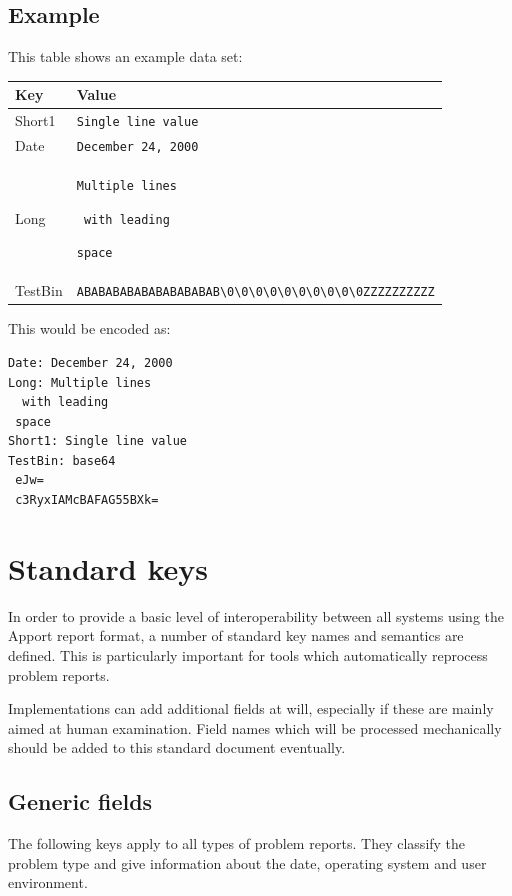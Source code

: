 \documentclass[DIV12,halfparskip]{scrartcl}
\begin{document}
\subsection{Example}

This table shows an example data set:

\begin{tabular}{lp{10cm}}\toprule
\textbf{Key} & \textbf{Value}\\
\midrule
Short1 & \verb!Single line value!\\
Date & \verb!December 24, 2000!\\
Long & \verb!Multiple lines!\par\verb! with leading!\par\verb!space!\\
TestBin & \verb!ABABABABABABABABABAB\0\0\0\0\0\0\0\0\0\0ZZZZZZZZZZ!\\
\bottomrule
\end{tabular}

This would be encoded as:

\begin{verbatim}
Date: December 24, 2000
Long: Multiple lines
  with leading
 space
Short1: Single line value
TestBin: base64
 eJw=
 c3RyxIAMcBAFAG55BXk=
\end{verbatim}

\section{Standard keys}

In order to provide a basic level of interoperability between all systems using
the Apport report format, a number of standard key names and semantics are
defined. This is particularly important for tools which automatically reprocess
problem reports.

Implementations can add additional fields at will, especially if these are
mainly aimed at human examination. Field names which will be processed
mechanically should be added to this standard document eventually.

\subsection{Generic fields}

The following keys apply to all types of problem reports. They classify the
problem type and give information about the date, operating system and user
environment.
\end{document}
